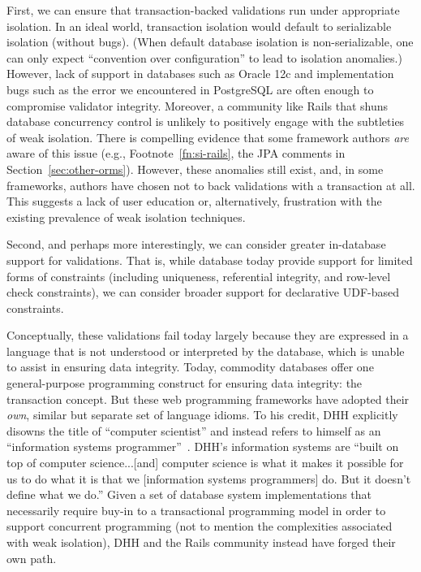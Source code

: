  First, we can ensure that
transaction-backed validations run under appropriate isolation. In an
ideal world, transaction isolation would default to serializable
isolation (without bugs). (When default database isolation is
non-serializable, one can only expect ``convention over
configuration'' to lead to isolation anomalies.)  However, lack of
support in databases such as Oracle 12c and implementation bugs such
as the error we encountered in PostgreSQL are often enough to
compromise validator integrity. Moreover, a community like Rails that
shuns database concurrency control is unlikely to positively engage
with the subtleties of weak isolation.  There is compelling evidence
that some framework authors \textit{are} aware of this issue (e.g.,
Footnote~\ref{fn:si-rails}, the JPA comments in
Section~\ref{sec:other-orms}). However, these anomalies still
exist, and, in some frameworks, authors have chosen not to back
validations with a transaction at all. This suggests a lack of user
education or, alternatively, frustration with the existing prevalence
of weak isolation techniques.

 Second, and perhaps more
interestingly, we can consider greater in-database support for
validations. That is, while database today provide support for limited
forms of constraints (including uniqueness, referential integrity, and
row-level check constraints), we can consider broader support for
declarative UDF-based constraints.

Conceptually, these validations fail today largely because they are
expressed in a language that is not understood or interpreted by the
database, which is unable to assist in ensuring data integrity. Today,
commodity databases offer one general-purpose programming construct
for ensuring data integrity: the transaction concept. But these web
programming frameworks have adopted their \textit{own}, similar but
separate set of language idioms. To his credit, DHH explicitly disowns
the title of ``computer scientist'' and instead refers to himself as
an ``information systems programmer''~\cite{dhh-keynote}. DHH's
information systems are ``built on top of computer science...[and]
computer science is what it makes it possible for us to do what it is
that we [information systems programmers] do. But it doesn't define
what we do.'' Given a set of database system implementations that
necessarily require buy-in to a transactional programming model in
order to support concurrent programming (not to mention the
complexities associated with weak isolation), DHH and the Rails
community instead have forged their own path.

